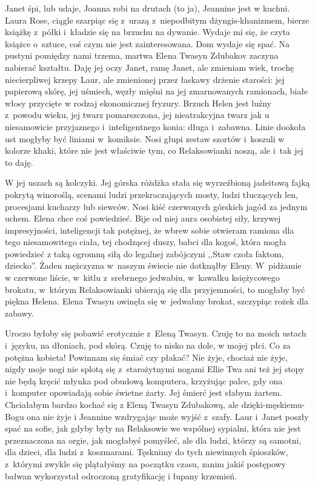 \documentclass[oneside,polish,12pt,sfheadings]{mwbk}
\begin{document}
Janet śpi, lub udaje, Joanna robi na drutach (to ja), Jeannine jest
w kuchni. Laura Rose, ciągle szarpiąc się z~urazą z~niepodbitym dżyngis-khanizmem,
bierze książkę z~półki i~kładzie się na brzuchu na dywanie. Wydaje
mi się, że czyta książce o~sztuce, coś czym nie jest zainteresowana.
Dom wydaje się spać. Na pustyni pomiędzy nami trzema, martwa Elena
Twasyn Zdubakov zaczyna nabierać kształtu. Daję jej oczy Janet, ramę
Janet, ale zmieniam wiek, trochę niecierpliwej krzepy Laur, ale zmienionej
przez łaskawy drżenie starości: jej papierową skórę, jej uśmiech,
węzły mięśni na jej zmarnowanych ramionach, białe włosy przycięte w
rodzaj ekonomicznej fryzury. Brzuch Helen jest luźny z~powodu wieku,
jej twarz pomarszczona, jej nieatrakcyjna twarz jak u niesamowicie
przyjaznego i~inteligentnego konia: długa i~zabawna. Linie dookoła
ust mogłyby być liniami w~komiksie. Nosi głupi zestaw szortów i~koszuli
w kolorze khaki, które nie jest właściwie tym, co Relaksowianki noszą,
ale i~tak jej to daję.

W jej uszach są kolczyki. Jej górska różdżka stała się wyrzeźbioną
jadeitową fajką pokrytą winoroślą, scenami ludzi przekraczających
mosty, ludzi tłuczących len, procesjami kucharzy lub siewców. Nosi
kiść czerwonych górskich jagód za jednym uchem. Elena chce coś powiedzieć.
Bije od niej aura osobistej siły, krzywej impresyjności, inteligencji
tak potężnej, że wbrew sobie otwieram ramiona dla tego niesamowitego
ciała, tej chodzącej duszy, babci dla kogoś, która mogła powiedzieć
z taką ogromną siłą do legalnej zabójczyni ,,Staw czoła faktom, dziecko''.
Żaden mężczyzna w~naszym świecie nie dotknąłby Eleny. W~pidżamie w
czerwone liście, w~kitlu z~srebrnego jedwabiu, w~kawałku księżycowego
brokatu, w~którym Relaksowianki ubierają się dla przyjemności, to
mogłaby być piękna Helena. Elena Twasyn owinęła się w~jedwabny brokat,
szczypiąc rożek dla zabawy.

Uroczo byłoby się pobawić erotycznie z~Eleną Twasyn. Czuję to na moich
ustach i~języku, na dłoniach, pod skórą. Czuję to nisko na dole, w
mojej płci. Co za potężna kobieta! Powinnam się śmiać czy płakać?
Nie żyje, chociaż nie żyje, nigdy moje nogi nie splotą się z~starożytnymi
nogami Ellie Twa ani też jej stopy nie będą kręcić młynka pod obudową
komputera, krzyżując palce, gdy ona i~komputer opowiadają sobie świetne
żarty. Jej śmierć jest słabym żartem. Chciałabym bardzo kochać się
z Eleną Twasyn Zdubakową, ale dzięki-męskiemu-Bogu ona nie żyje i
Jeannine wzdrygając może wyjść z~szafy. Laur i~Janet poszły spać na
sofie, jak gdyby były na Relaksowie we wspólnej sypialni, która nie
jest przeznaczona na orgie, jak mogłabyś pomyśleć, ale dla ludzi,
którzy są samotni, dla dzieci, dla ludzi z~koszmarami. Tęsknimy do
tych niewinnych śpioszków, z~którymi zwykle się plątałyśmy na początku
czasu, zanim jakiś postępowy bałwan wykorzystał odroczoną gratyfikację
i łupany krzemień.
\end{document}
